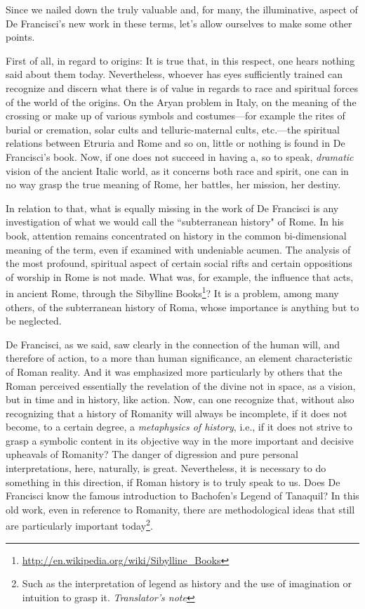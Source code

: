 Since we nailed down the truly valuable and, for many, the illuminative, aspect of De Francisci's new work in these terms, let's allow ourselves to make some other points.

First of all, in regard to origins: It is true that, in this respect, one hears nothing said about them today. Nevertheless, whoever has eyes sufficiently trained can recognize and discern what there is of value in regards to race and spiritual forces of the world of the origins. On the Aryan problem in Italy, on the meaning of the crossing or make up of various symbols and costumes—for example the rites of burial or cremation, solar cults and telluric-maternal cults, etc.—the spiritual relations between Etruria and Rome and so on, little or nothing is found in De Francisci's book. Now, if one does not succeed in having a, so to speak, \emph{dramatic} vision of the ancient Italic world, as it concerns both race and spirit, one can in no way grasp the true meaning of Rome, her battles, her mission, her destiny.

In relation to that, what is equally missing in the work of De Francisci is any investigation of what we would call the ``subterranean history" of Rome. In his book, attention remains concentrated on history in the common bi-dimensional meaning of the term, even if examined with undeniable acumen. The analysis of the most profound, spiritual aspect of certain social rifts and certain oppositions of worship in Rome is not made. What was, for example, the influence that acts, in ancient Rome, through the Sibylline Books\footnote{\url{http://en.wikipedia.org/wiki/Sibylline_Books}}? It is a problem, among many others, of the subterranean history of Roma, whose importance is anything but to be neglected.

De Francisci, as we said, saw clearly in the connection of the human will, and therefore of action, to a more than human significance, an element characteristic of Roman reality. And it was emphasized more particularly by others that the Roman perceived essentially the revelation of the divine not in space, as a vision, but in time and in history, like action. Now, can one recognize that, without also recognizing that a history of Romanity will always be incomplete, if it does not become, to a certain degree, a \emph{metaphysics of history}, i.e., if it does not strive to grasp a symbolic content in its objective way in the more important and decisive upheavals of Romanity? The danger of digression and pure personal interpretations, here, naturally, is great. Nevertheless, it is necessary to do something in this direction, if Roman history is to truly speak to us. Does De Francisci know the famous introduction to Bachofen's Legend of Tanaquil? In this old work, even in reference to Romanity, there are methodological ideas that still are particularly important today\footnote{Such as the interpretation of legend as history and the use of imagination or intuition to grasp it. \emph{Translator's note}}.


